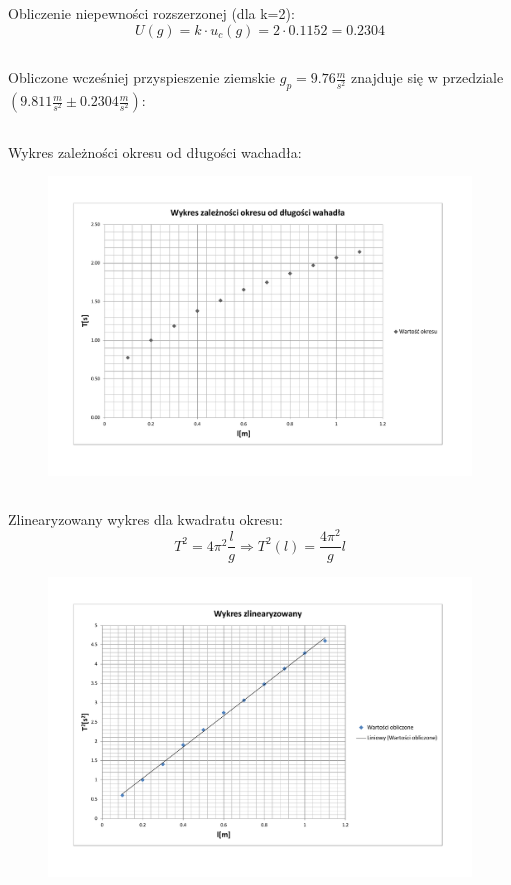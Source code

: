 \documentclass{article}
\begin{document}
    \subsection{}
        Obliczenie niepewności rozszerzonej (dla k=2):
        \[
        U(g)= k\cdot{}u_{c}(g) = 2\cdot{}0.1152 = 0.2304
        \]
    \subsection{}
        Obliczone wcześniej przyspieszenie ziemskie $g_p = 9.76\frac{m}{s^2}$ znajduje się w przedziale $(9.811\frac{m}{s^2} \pm 0.2304\frac{m}{s^2})$:
    \subsection{}
        Wykres zależności okresu od długości wachadła:
        \begin{figure}[h]
        \centering
        \includegraphics[width=0.9 \textwidth]{wykres3.pdf}
        \label{fig:wyk1}
        \end{figure}\newpage
    \subsection{}
        Zlinearyzowany wykres dla kwadratu okresu:
        \[
            T^{2}=4\pi{}^{2}\frac{l}{g} \Rightarrow T^{2}(l)=\frac{4\pi{}^{2}}{g}l
        \]
        \begin{figure}[h]
        \centering
        \includegraphics[width=1 \textwidth]{wykres4.pdf}
        \label{fig:wyk2}
        \end{figure}
\end{document}

